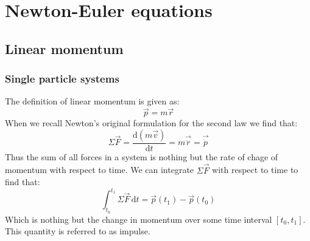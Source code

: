 \documentclass[11pt, a4paper]{article}
\renewcommand*{\d}{\text{d}}
\numberwithin{equation}{section}
\numberwithin{figure}{section}
\begin{document}
\setcounter{section}{2}
\section{Newton-Euler equations}

\subsection{Linear momentum}
\subsubsection{Single particle systems}
The definition of linear momentum is given as:
\begin{equation}
  \vec{p} = m\vec{r}
\end{equation}
When we recall Newton's original formulation for the second law we find that:
\begin{equation}
  \Sigma \vec{F} = \frac{\d(m\vec{v})}{\d t} = m\vec{\ddot{r}} = \vec{\dot{p}}
\end{equation}
Thus the sum of all forces in a system is nothing but the rate of chage of momentum with respect to time. We can integrate $\Sigma \vec{F}$ with respect to time to find that:
\begin{equation}
  \int_{t_0}^{t_1} \Sigma \vec{F}\,\d t = \vec{p}(t_1) - \vec{p}(t_0)
\end{equation}
Which is nothing but the change in momentum over some time interval $[t_0, t_1]$. This quantity is referred to as impulse.
\end{document}
